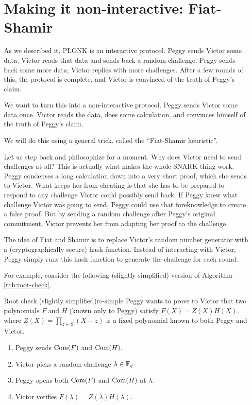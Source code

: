 \section{Making it non-interactive: Fiat-Shamir}

As we described it, PLONK is an interactive protocol. Peggy sends Victor
some data; Victor reads that data and sends back a random challenge.
Peggy sends back some more data; Victor replies with more challenges.
After a few rounds of this, the protocol is complete, and Victor is
convinced of the truth of Peggy's claim.

We want to turn this into a non-interactive protocol. Peggy sends Victor
some data once. Victor reads the data, does some calculation, and
convinces himself of the truth of Peggy's claim.

We will do this using a general trick, called the
\alert{``Fiat-Shamir heuristic''}.

Let us step back and philosophize for a moment. Why does Victor need to
send challenges at all? This is actually what makes the whole SNARK
thing work. Peggy condenses a long calculation down into a very short
proof, which she sends to Victor. What keeps her from cheating is that
she has to be prepared to respond to any challenge Victor could possibly
send back. If Peggy knew what challenge Victor was going to send, Peggy
could use that foreknowledge to create a false proof. But by sending a
random challenge after Peggy's original commitment, Victor prevents her
from adapting her proof to the challenge.

The idea of Fiat and Shamir is to replace Victor's random number
generator with a (cryptographically secure) hash function. Instead of
interacting with Victor, Peggy simply runs this hash function to
generate the challenge for each round.

For example, consider the following (slightly simplified) version of
Algorithm \ref{tcb:root-check}.

\begin{algo}{Root check (slightly simplified)}{rc-simple}
  Peggy wants to prove to Victor that two polynomials $F$ and $H$
  (known only to Peggy) satisfy $F(X) = Z(X)H(X)$, where
  $Z(X) = \prod_{z \in S}(X - z)$ is a fixed polynomial known to both
  Peggy and Victor.

  \begin{enumerate}
  \item Peggy sends $\operatorname{Com}(F)$ and $\operatorname{Com}(H)$.
  \item Victor picks a random challenge $\lambda \in \mathbb{F}_{q}$
  \item Peggy opens both $\operatorname{Com}(F)$ and $\operatorname{Com}(H)$ at $\lambda$.
  \item Victor verifies $F(\lambda) = Z(\lambda)H(\lambda)$.
  \end{enumerate}
\end{algo}


